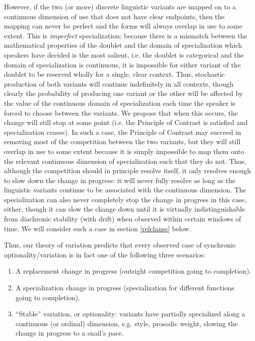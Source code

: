 However, if the two (or more) discrete linguistic variants are mapped on to a continuous dimension of use that does not have clear endpoints, then the mapping can never be perfect and the forms will always overlap in use to some extent.
This is \textsl{imperfect} specialization: because there is a mismatch between the mathematical properties of the doublet and the domain of specialization which speakers have decided is the most salient, i.e. the doublet is categorical and the domain of specialization is continuous, it is impossible for either variant of the doublet to be reserved wholly for a single, clear context.
Thus, stochastic production of both variants will continue indefinitely in all contexts, though clearly the probability of producing one variant or the other will be affected by the value of the continuous domain of specialization each time the speaker is forced to choose between the variants.
We propose that when this occurs, the change will still stop at some point (i.e. the Principle of Contrast is satisfied and specialization ceases).
In such a case, the Principle of Contrast may succeed in removing most of the competition between the two variants, but they will still overlap in use to some extent because it is simply impossible to map them onto the relevant continuous dimension of specialization such that they do not.
Thus, although the competition should in principle resolve itself, it only resolves enough to slow down the change in progress: it will never fully resolve as long as the linguistic variants continue to be associated with the continuous dimension.
The specialization can also never completely stop the change in progress in this case, either, though it can slow the change down until it is virtually indistinguishable from diachronic stability (with drift) when observed within certain windows of time.
We will consider such a case in section \ref{relclause} below.

Thus, our theory of variation predicts that every observed case of synchronic optionality/variation is in fact one of the following three scenarios:

\begin{enumerate}
			\item A replacement change in progress (outright competition going to completion).
			\item A specialization change in progress (specialization for different functions going to completion).
			\item ``Stable'' variation, or optionality: variants have partially specialized along a continuous (or ordinal) dimension, e.g. style, prosodic weight, slowing the change in progress to a snail's pace. 
		\end{enumerate}


